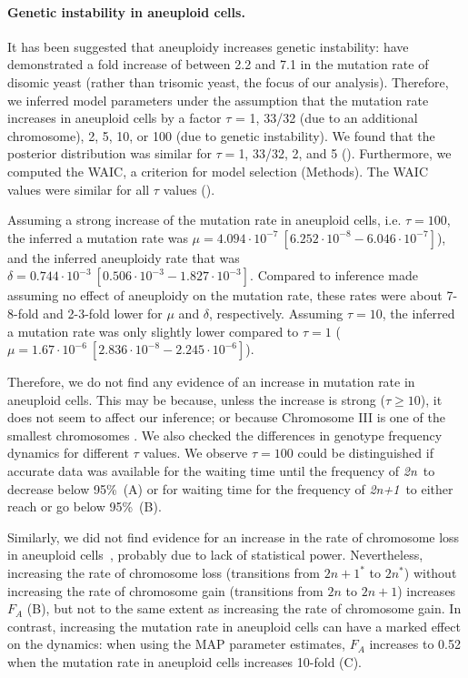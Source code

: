 \documentclass[12pt]{extarticle}
\newcommand{\euwt}{\emph{2n}}
\newcommand{\anwt}{\emph{2n+1}}
\begin{document}
\paragraph{Genetic instability in aneuploid cells.}
It has been suggested that aneuploidy increases genetic instability: \citet{Sheltzer2011b} have demonstrated a fold increase of between 2.2 and 7.1 in the mutation rate of disomic yeast (rather than trisomic yeast, the focus of our analysis).
Therefore, we inferred model parameters under the assumption that the mutation rate increases in aneuploid cells by a factor $\tau$ = 1, 33/32 (due to an additional chromosome), 2, 5, 10, or 100 (due to genetic instability).
We found that the posterior distribution was similar for $\tau=$1, 33/32, 2, and 5 (). Furthermore, we computed the WAIC, a criterion for model selection (Methods). The WAIC values were similar for all $\tau$ values ().

Assuming a strong increase of the mutation rate in aneuploid cells, i.e. $\tau=100$, the inferred a mutation rate was $\mu=4.094\cdot10^{-7}\ [6.252\cdot10^{-8}-6.046\cdot10^{-7}]$), and the inferred aneuploidy rate that was  $\delta=0.744\cdot10^{-3}\ [0.506\cdot10^{-3}-1.827\cdot10^{-3}]$. 
Compared to inference made assuming no effect of aneuploidy on the mutation rate, these rates were about 7-8-fold and 2-3-fold lower for $\mu$ and $\delta$, respectively.
Assuming $\tau=10$, the inferred a mutation rate was only slightly lower compared to $\tau=1$ ($\mu=1.67\cdot10^{-6}\ [2.836\cdot10^{-8}-2.245\cdot10^{-6}]$). 

Therefore, we do not find any evidence of an increase in mutation rate in aneuploid cells. This may be because, unless the increase is strong ($\tau \ge 10$), it does not seem to affect our inference; or because Chromosome III is one of the smallest chromosomes \citep{Gilchrist2019}.
We also checked the differences in genotype frequency dynamics for different $\tau$ values. We observe $\tau=100$ could be distinguished if accurate data was available for the waiting time until the frequency of \euwt\ to decrease below 95\%~(A) or for waiting time for the frequency of \anwt\ to either reach or go below 95\%~(B).

Similarly, we did not find evidence for an increase in the rate of chromosome loss in aneuploid cells~\citep{Sheltzer2011b}, probably due to lack of statistical power.
Nevertheless, increasing the rate of chromosome loss (transitions from $2n+1^*$ to $2n^*$) without increasing the rate of chromosome gain (transitions from $2n$ to $2n+1$) increases $F_A$ (B), but not to the same extent as increasing the rate of chromosome gain.
In contrast, increasing the mutation rate in aneuploid cells can have a marked effect on the dynamics: when using the MAP parameter estimates, $F_A$ increases to  0.52 when the mutation rate in aneuploid cells increases 10-fold (C).
\end{document}
